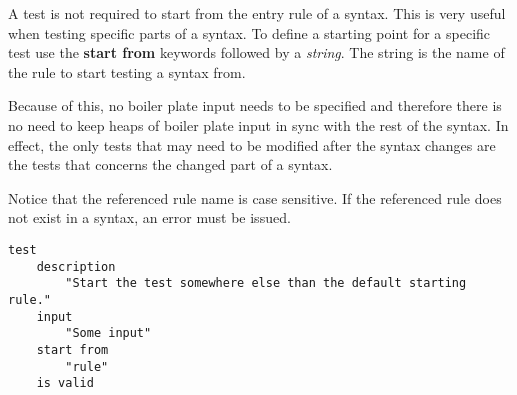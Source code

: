 

A test is not required to start from the entry rule of a syntax. This is very 
useful when testing specific parts of a syntax. To define a starting point for a
specific test use the \textbf{start from} keywords followed by a 
\textit{string}. The string is the name of the rule to start testing a syntax 
from.

Because of this, no boiler plate input needs to be specified and therefore
there is no need to keep heaps of boiler plate input in sync with the rest of 
the syntax. In effect, the only tests that may need to be modified after the 
syntax changes are the tests that concerns the changed part of a syntax.

Notice that the referenced rule name is case sensitive. If the referenced rule 
does not exist in a syntax, an error must be issued.

\begin{lstlisting}[style = SrtL]
test
    description
        "Start the test somewhere else than the default starting rule."
    input 
        "Some input"
    start from
        "rule"
    is valid
\end{lstlisting}